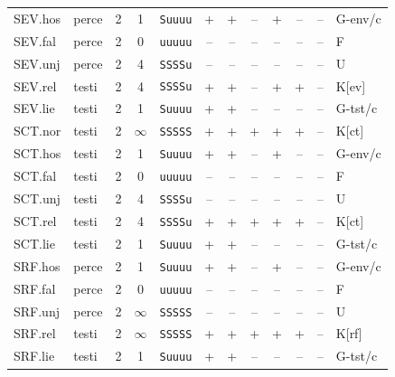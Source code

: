 {\begin{longtable}{@{}llcccccccccl@{}}
SEV.hos & perce & 2 & 1 & \texttt{Suuuu} & \textsf{+} & \textsf{+} & \textsf{--} & \textsf{+} & \textsf{--} & -- & G-env/c \\
SEV.fal & perce & 2 & 0 & \texttt{uuuuu} & \textsf{--} & \textsf{--} & \textsf{--} & \textsf{--} & \textsf{--} & -- & F \\
SEV.unj & perce & 2 & 4 & \texttt{SSSSu} & \textsf{--} & \textsf{--} & \textsf{--} & \textsf{--} & \textsf{--} & -- & U \\
SEV.rel & testi & 2 & 4 & \texttt{SSSSu} & \textsf{+} & \textsf{+} & \textsf{--} & \textsf{+} & \textsf{+} & -- & K[ev] \\
SEV.lie & testi & 2 & 1 & \texttt{Suuuu} & \textsf{+} & \textsf{+} & \textsf{--} & \textsf{--} & \textsf{--} & -- & G-tst/c \\
SCT.nor & testi & 2 & $\infty$ & \texttt{SSSSS} & \textsf{+} & \textsf{+} & \textsf{+} & \textsf{+} & \textsf{+} & -- & K[ct] \\
SCT.hos & testi & 2 & 1 & \texttt{Suuuu} & \textsf{+} & \textsf{+} & \textsf{--} & \textsf{+} & \textsf{--} & -- & G-env/c \\
SCT.fal & testi & 2 & 0 & \texttt{uuuuu} & \textsf{--} & \textsf{--} & \textsf{--} & \textsf{--} & \textsf{--} & -- & F \\
SCT.unj & testi & 2 & 4 & \texttt{SSSSu} & \textsf{--} & \textsf{--} & \textsf{--} & \textsf{--} & \textsf{--} & -- & U \\
SCT.rel & testi & 2 & 4 & \texttt{SSSSu} & \textsf{+} & \textsf{+} & \textsf{+} & \textsf{+} & \textsf{+} & -- & K[ct] \\
SCT.lie & testi & 2 & 1 & \texttt{Suuuu} & \textsf{+} & \textsf{+} & \textsf{--} & \textsf{--} & \textsf{--} & -- & G-tst/c \\
SRF.hos & perce & 2 & 1 & \texttt{Suuuu} & \textsf{+} & \textsf{+} & \textsf{--} & \textsf{+} & \textsf{--} & -- & G-env/c \\
SRF.fal & perce & 2 & 0 & \texttt{uuuuu} & \textsf{--} & \textsf{--} & \textsf{--} & \textsf{--} & \textsf{--} & -- & F \\
SRF.unj & perce & 2 & $\infty$ & \texttt{SSSSS} & \textsf{--} & \textsf{--} & \textsf{--} & \textsf{--} & \textsf{--} & -- & U \\
SRF.rel & testi & 2 & $\infty$ & \texttt{SSSSS} & \textsf{+} & \textsf{+} & \textsf{+} & \textsf{+} & \textsf{+} & -- & K[rf] \\
SRF.lie & testi & 2 & 1 & \texttt{Suuuu} & \textsf{+} & \textsf{+} & \textsf{--} & \textsf{--} & \textsf{--} & -- & G-tst/c \\

\end{longtable}}
